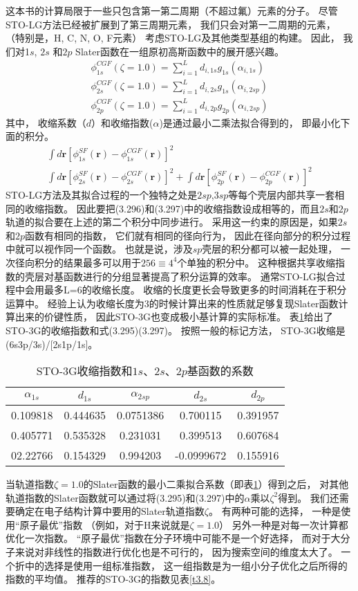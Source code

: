 这本书的计算局限于一些只包含第一第二周期（不超过氟）元素的分子。
尽管STO-LG方法已经被扩展到了第三周期元素，
我们只会对第一二周期的元素，
（特别是，H, C, N, O, F元素）
考虑STO-LG及其他类型基组的构建。
因此，
我们对1$s$,
$2s$ 和$2p$ Slater函数在一组原初高斯函数中的展开感兴趣。
\begin{align}
	\phi_{1s}^{CGF}(\zeta=1.0)=\sum_{i=1}^{L}d_{i,1s}g_{1s}(\alpha_{i,1s})\\
	\phi_{2s}^{CGF}(\zeta=1.0)=\sum_{i=1}^{L}d_{i,2s}g_{1s}(\alpha_{i,2sp})\\
	\phi_{2p}^{CGF}(\zeta=1.0)=\sum_{i=1}^{L}d_{i,2p}g_{2p}(\alpha_{i,2sp})
\end{align}
其中，
收缩系数（$d$）和收缩指数($\alpha$)是通过最小二乘法拟合得到的，
即最小化下面的积分。
\begin{align*}
	\int d\mathbf{r}[\phi_{1s}^{SF}(\mathbf{r})-\phi_{1s}^{CGF}(\mathbf{r})]^2\\
	\int d\mathbf{r}[\phi_{2s}^{SF}(\mathbf{r})-\phi_{2s}^{CGF}(\mathbf{r})]^2+	\int d\mathbf{r}[\phi_{2p}^{SF}(\mathbf{r})-\phi_{2p}^{CGF}(\mathbf{r})]^2
\end{align*}
STO-LG方法及其拟合过程的一个独特之处是$2sp$,$3sp$等每个壳层内部共享一套相同的收缩指数。
因此要把(3.296)和(3.297)中的收缩指数设成相等的，而且$2s$和$2p$轨道的拟合要在上述的第二个积分中同步进行。
采用这一约束的原因是，如果$2s$和$2p$函数有相同的指数，
它们就有相同的径向行为，
因此在径向部分的积分过程中就可以视作同一个函数。
也就是说，涉及$sp$壳层的积分都可以被一起处理，
一次径向积分的结果最多可以用于$256\equiv4^4$个单独的积分中。
这种根据共享收缩指数的壳层对基函数进行的分组显著提高了积分运算的效率。
通常STO-LG拟合过程中会用最多L=6的收缩长度。
收缩的长度更长会导致更多的时间消耗在于积分运算中。
经验上认为收缩长度为3的时候计算出来的性质就足够复现Slater函数计算出来的价键性质，
因此STO-3G也变成极小基计算的实际标准。
表\ref{t3.7}给出了STO-3G的收缩指数和式(3.295)(3.297)。
按照一般的标记方法，
STO-3G收缩是(6s3p/3s)/[2s1p/1s]。
\begin{table}[h]
	\centering\caption{STO-3G收缩指数和$1s$、$2s$、$2p$基函数的系数}
	\begin{tabular}{ccccc}
		\hline
		$\alpha_{1s}$&$d_{1s}$&$\alpha_{2sp}$&$d_{2s}$&$d_{2p}$\\\hline
		0.109818	 &0.444635&0.0751386	 &0.700115&0.391957\\
		0.405771	 &0.535328&0.231031	 &0.399513&0.607684\\
		02.22766	 &0.154329&0.994203	 &-0.0999672&0.155916\\
		\hline
	\end{tabular}
	\label{t3.7}
\end{table}
当轨道指数$\zeta = 1.0$的Slater函数的最小二乘拟合系数（即表\ref{t3.7}）得到之后，
对其他轨道指数的Slater函数就可以通过将(3.295)和(3.297)中的$\alpha$乘以$\zeta^2$得到。
我们还需要确定在电子结构计算中要用的Slater轨道指数$\zeta$。
有两种可能的选择，
一种是使用“原子最优”指数
（例如，对于H来说就是$\zeta=1.0$）
另外一种是对每一次计算都优化一次指数。
“原子最优”指数在分子环境中可能不是一个好选择，
而对于大分子来说对非线性的指数进行优化也是不可行的，
因为搜索空间的维度太大了。
一个折中的选择是使用一组标准指数，
这一组指数是为一组小分子优化之后所得的指数的平均值。
推荐的STO-3G的指数见表\ref{t3.8}。

